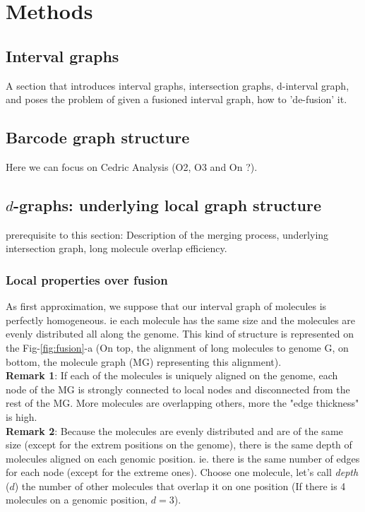 \documentclass{article}
\begin{document}
\section{Methods}

\subsection{Interval graphs}

A section that introduces interval graphs, intersection graphs, d-interval graph, and poses the problem of given a fusioned interval graph, how to 'de-fusion' it.

\subsection{Barcode graph structure}
Here we can focus on Cedric Analysis (O2, O3 and On ?).

\subsection{$d$-graphs: underlying local graph structure}
prerequisite to this section: Description of the merging process, underlying intersection graph, long molecule overlap efficiency. 

\subsubsection*{Local properties over fusion}

As first approximation, we suppose that our interval graph of molecules is perfectly homogeneous.
ie each molecule has the same size and the molecules are evenly distributed all along the genome.
This kind of structure is represented on the Fig-\ref{fig:fusion}-a (On top, the alignment of long molecules to genome G, on bottom, the molecule graph (MG) representing this alignment).\\
\textbf{Remark 1}: If each of the molecules is uniquely aligned on the genome, each node of the MG is strongly connected to local nodes and disconnected from the rest of the MG. More molecules are overlapping others, more the "edge thickness" is high.\\
\textbf{Remark 2}: Because the molecules are evenly distributed and are of the same size (except for the extrem positions on the genome), there is the same depth of molecules aligned on each genomic position. ie. there is the same number of edges for each node (except for the extreme ones). Choose one molecule, let's call \textit{depth} ($d$) the number of other molecules that overlap it on one position (If there is 4 molecules on a genomic position, $d=3$).
\end{document}
